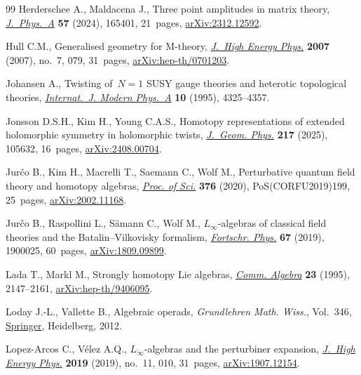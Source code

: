 \documentclass[pdftex]{sigma}
\numberwithin{equation}{section}
\theoremstyle{definition}
\begin{document}
\begin{thebibliography}{99}
Herderschee A., Maldacena J., Three point amplitudes in matrix theory,
 \href{https://doi.org/10.1088/1751-8121/ad389b}{\textit{J.~Phys.~A}}
 \textbf{57} (2024), 165401, 21~pages,
 \href{http://arxiv.org/abs/2312.12592}{arXiv:2312.12592}.

Hull C.M., Generalised geometry for {M}-theory,
 \href{https://doi.org/10.1088/1126-6708/2007/07/079}{\textit{J.~High Energy
 Phys.}} \textbf{2007} (2007), no.~7, 079, 31~pages,
 \href{http://arxiv.org/abs/hep-th/0701203}{arXiv:hep-th/0701203}.

Johansen A., Twisting of~{$N=1$} {SUSY} gauge theories and heterotic
 topological theories,
 \href{https://doi.org/10.1142/S0217751X9500200X}{\textit{Internat.~J. Modern
 Phys.~A}} \textbf{10} (1995), 4325--4357.

Jonsson D.S.H., Kim H., Young C.A.S., Homotopy representations of extended
 holomorphic symmetry in holomorphic twists,
 \href{https://doi.org/10.1016/j.geomphys.2025.105632}{\textit{J.~Geom.
 Phys.}} \textbf{217} (2025), 105632, 16~pages,
 \href{http://arxiv.org/abs/2408.00704}{arXiv:2408.00704}.

Jur\v{c}o B., Kim H., Macrelli T., Saemann C., Wolf M., Perturbative quantum
 field theory and homotopy algebras,
 \href{https://doi.org/10.22323/1.376.0199}{\textit{Proc. of Sci.}}
 \textbf{376} (2020), PoS(CORFU2019)199, 25~pages,
 \href{http://arxiv.org/abs/2002.11168}{arXiv:2002.11168}.

Jur\v{c}o B., Raspollini L., S\"amann C., Wolf M., {$L_\infty$}-algebras of
 classical field theories and the {B}atalin--{V}ilkovisky formalism,
 \href{https://doi.org/10.1002/prop.201900025}{\textit{Fortschr. Phys.}}
 \textbf{67} (2019), 1900025, 60~pages,
 \href{http://arxiv.org/abs/1809.09899}{arXiv:1809.09899}.

Lada T., Markl M., Strongly homotopy {L}ie algebras,
 \href{https://doi.org/10.1080/00927879508825335}{\textit{Comm. Algebra}}
 \textbf{23} (1995), 2147--2161,
 \href{http://arxiv.org/abs/hep-th/9406095}{arXiv:hep-th/9406095}.

Loday J.-L., Vallette B., Algebraic operads, \textit{Grundlehren Math. Wiss.},
 Vol.~346, \href{https://doi.org/10.1007/978-3-642-30362-3}{Springer},
 Heidelberg, 2012.

Lopez-Arcos C., V\'elez A.Q., {$L_\infty$}-algebras and the perturbiner
 expansion, \href{https://doi.org/10.1007/jhep11(2019)010}{\textit{J.~High
 Energy Phys.}} \textbf{2019} (2019), no.~11, 010, 31~pages,
 \href{http://arxiv.org/abs/1907.12154}{arXiv:1907.12154}.


\end{thebibliography}
\end{document}
